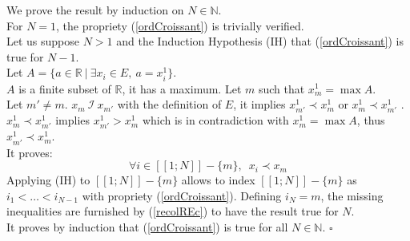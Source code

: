 \documentclass{meta}
\def\NN{{\mathbb{N}}}
\def\RR{{\mathbb{R}}}
\begin{document}
We prove the result by induction on $N \in \NN$.\\
For $N=1$, the propriety (\ref{ordCroissant}) is trivially verified.\\
Let us suppose $N>1$ and the Induction Hypothesis (IH) that (\ref{ordCroissant}) is true for $N-1$.\\
Let $A = \{a \in \RR \: | \: \exists x_i \in E, \: a = x_i^1 \}$.\\
$A$ is a finite subset of $\RR$, it has a maximum. Let $m$ such that  $x_m^1 = \max A$. \\
Let $m'\neq m$. 
$x_m \: \mathcal{I} \: x_{m'}$ with the definition of $E$, it implies $x_{m'}^1 \prec x_m^1$  or $x_{m}^1 \prec x_{m'}^1$ .\\ 
$x_{m}^1 \prec x_{m'}^1$ implies $x_{m'}^1 > x_m^1$ which is in contradiction with  $x_m^1 = \max A$, thus $x_{m'}^1 \prec x_m^1$.\\
It proves:
\begin{equation}\label{recolREc}
\forall i \in [\![1;N]\!]-\{m\}, \phantom{3} x_{i} \prec x_{m}
\end{equation}
Applying (IH) to $[\![1;N]\!]-\{m\}$ allows to index $[\![1;N]\!]-\{m\}$ as $i_1 < \dots < i_{N-1}$ with propriety (\ref{ordCroissant}).
Defining $i_N = m$, the missing inequalities are furnished by  (\ref{recolREc}) to have the result true for $N$.\\
It proves by induction that (\ref{ordCroissant}) is true for all $N \in \NN$. $\square$
\end{document}

